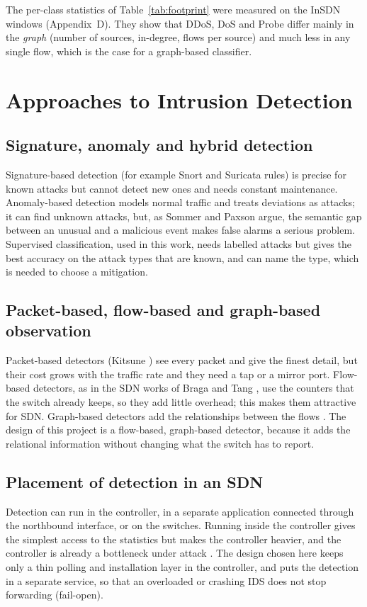 The per-class statistics of Table~\ref{tab:footprint} were measured on the InSDN windows (Appendix~D). They show that DDoS, DoS and Probe differ mainly in the \emph{graph} (number of sources, in-degree, flows per source) and much less in any single flow, which is the case for a graph-based classifier.

\section{Approaches to Intrusion Detection}

\subsection{Signature, anomaly and hybrid detection}
Signature-based detection (for example Snort and Suricata rules) is precise for known attacks but cannot detect new ones and needs constant maintenance. Anomaly-based detection models normal traffic and treats deviations as attacks; it can find unknown attacks, but, as Sommer and Paxson \cite{bib:sommer} argue, the semantic gap between an unusual and a malicious event makes false alarms a serious problem. Supervised classification, used in this work, needs labelled attacks but gives the best accuracy on the attack types that are known, and can name the type, which is needed to choose a mitigation.

\subsection{Packet-based, flow-based and graph-based observation}
Packet-based detectors (Kitsune \cite{bib:kitsune}) see every packet and give the finest detail, but their cost grows with the traffic rate and they need a tap or a mirror port. Flow-based detectors, as in the SDN works of Braga \cite{bib:braga} and Tang \cite{bib:tang}, use the counters that the switch already keeps, so they add little overhead; this makes them attractive for SDN. Graph-based detectors add the relationships between the flows \cite{bib:egraphsage,bib:anomale}. The design of this project is a flow-based, graph-based detector, because it adds the relational information without changing what the switch has to report.

\subsection{Placement of detection in an SDN}
Detection can run in the controller, in a separate application connected through the northbound interface, or on the switches. Running inside the controller gives the simplest access to the statistics but makes the controller heavier, and the controller is already a bottleneck under attack \cite{bib:yan}. The design chosen here keeps only a thin polling and installation layer in the controller, and puts the detection in a separate service, so that an overloaded or crashing IDS does not stop forwarding (fail-open).


